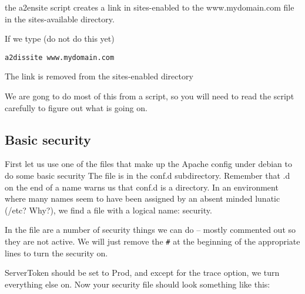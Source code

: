 \documentclass[12pt, a4paper]{article}
\begin{document}
the a2ensite script creates a link in sites-enabled to the www.mydomain.com file in the sites-available directory.

If we type  (do not do this yet)

\begin{verbatim}
a2dissite www.mydomain.com
\end{verbatim}

The link is removed from the sites-enabled directory

We are gong to do most of this from a script, so you will need to read the script carefully to figure out what is going on.

\subsection*{Basic security}


First let us use one of the files that make up the Apache config under debian to do some basic security
The file is in the conf.d subdirectory. Remember that .d on the end of a name warns us that conf.d is a directory. In an environment where many names seem to have been assigned by an absent minded lunatic (/etc? Why?), we find a file with a logical name: security.

In the file are a number of security things we can do – mostly commented out so they are not active. We will just remove the \verb|#| at the beginning of the appropriate lines to turn the security on.

ServerToken should be set to Prod, and except for the trace option, we turn everything else on. 
Now your security file should look something like this:
\end{document}
